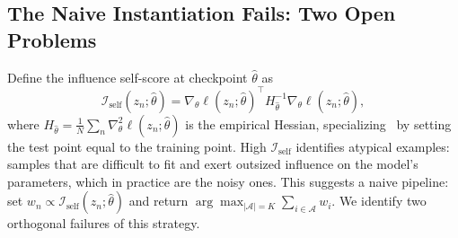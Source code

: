 \subsection{The Naive Instantiation Fails: Two Open Problems} \label{sec:03-theory-failures}
\begin{foldable} %
  Define the influence self-score at checkpoint $\hat{\theta}$ as
  \begin{equation}
    \mathcal{I}_\text{self}(z_n; \hat{\theta}) = \nabla_\theta \ell(z_n; \hat{\theta})^\top H_{\hat{\theta}}^{-1} \nabla_\theta \ell(z_n; \hat{\theta}),
    \label{eq:influence-self}
  \end{equation}
  where $H_{\hat{\theta}} = \frac{1}{N}\sum_n \nabla^2_\theta \ell(z_n; \hat{\theta})$ is the empirical Hessian, specializing~\cite{koh2017understanding} by setting the test point equal to the training point.
  High $\mathcal{I}_\text{self}$ identifies atypical examples: samples that are difficult to fit and exert outsized influence on the model's parameters, which in practice are the noisy ones.
  This suggests a naive pipeline: set $w_n \propto \mathcal{I}_\text{self}(z_n; \hat{\theta})$ and return $\arg\max_{|\mathcal{A}|=K} \sum_{i \in \mathcal{A}} w_i$.
  We identify two orthogonal failures of this strategy.
\end{foldable}


